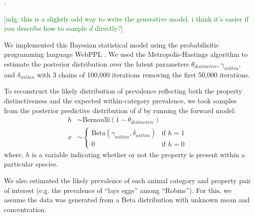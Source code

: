 \documentclass[10pt,letterpaper]{article}
\newcommand{\ndg}[1]{\textcolor{Green}{[ndg: #1]}}
\begin{document}
%
%
. 
%

\ndg{this is a slightly odd way to write the generative model. i think it's easier if you describe how to sample $d$ directly?}


We implemented this Bayesian statistical model using the probabilisitic programming language WebPPL \cite{dippl}. 
We used the Metropolis-Hastings algorithm to estimate the posterior distribution over the latent parameters $\theta_{distinctive}, \gamma_{within}$, and $\delta_{within}$ with 3 chains of 100,000 iterations removing the first 50,000 iterations.

To reconstruct the likely distribution of  prevalence reflecting both the property distinctiveness and the expected within-category prevalence, we took samples from the posterior predictive distribution of $d$ by running the forward model: 
%
\begin{align*}
h & \sim \text{Bernoulli}(1 - \theta_{distinctive}) \\
x & \sim \begin{cases} 
		\text{Beta}(\gamma_{within}, \delta_{within}) &\mbox{if } h = 1 \\ 
				0 & \mbox{if } h=0
				\end{cases} 
\end{align*}
%
where, $h$ is a variable indicating whether or not the property is present within a particular species. 

We also estimated the likely prevalence of each animal category and property pair of interest (e.g. the prevalence of ``lays eggs'' among ``Robins''). %
For this, we assume the data was generated from a Beta distribution with unknown mean and concentration. 
\end{document}
